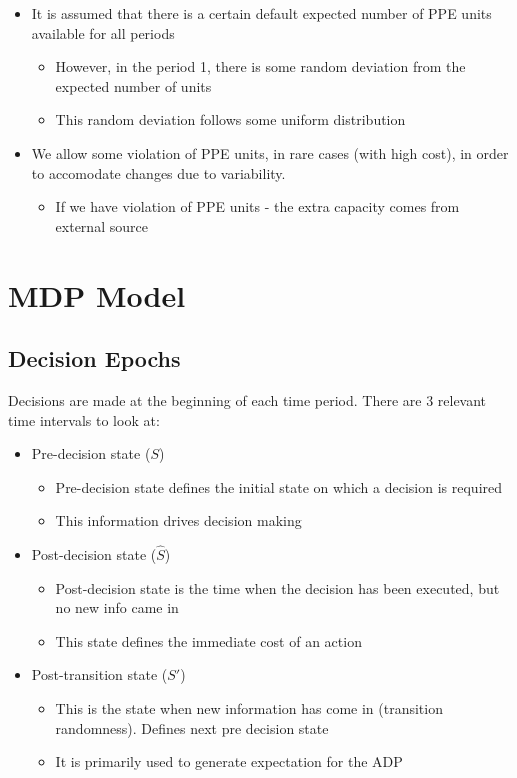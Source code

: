 \documentclass{article}
\begin{document}
\begin{itemize}
	\item It is assumed that there is a certain default expected number of PPE units available for all periods
	\begin{itemize}
		\item However, in the period 1, there is some random deviation from the expected number of units
		\item This random deviation follows some uniform distribution
	\end{itemize}
	\item We allow some violation of PPE units, in rare cases (with high cost), in order to accomodate changes due to variability.
	\begin{itemize}
		\item If we have violation of PPE units - the extra capacity comes from external source
	\end{itemize}
\end{itemize}


\section{MDP Model}
\subsection{Decision Epochs}
Decisions are made at the beginning of each time period. There are 3 relevant time intervals to look at:
\begin{itemize}
	\item Pre-decision state ($S$)
	\begin{itemize}
		\item Pre-decision state defines the initial state on which a decision is required
		\item This information drives decision making
	\end{itemize}

	\item Post-decision state ($\hat{S}$)
	\begin{itemize}
		\item Post-decision state is the time when the decision has been executed, but no new info came in
		\item This state defines the immediate cost of an action
	\end{itemize} 

	\item Post-transition state ($S'$)
	\begin{itemize}
		\item This is the state when new information has come in (transition randomness). Defines next pre decision state
		\item It is primarily used to generate expectation for the ADP
	\end{itemize}
\end{itemize}
\end{document}
